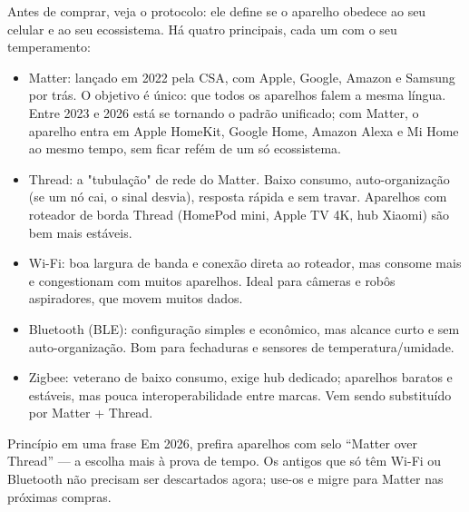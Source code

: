 


Antes de comprar, veja o protocolo: ele define se o aparelho obedece ao seu celular e ao seu ecossistema. Há quatro principais, cada um com o seu temperamento:

\begin{itemize}
  \item Matter: lançado em 2022 pela CSA, com Apple, Google, Amazon e Samsung por trás. O objetivo é único: que todos os aparelhos falem a mesma língua. Entre 2023 e 2026 está se tornando o padrão unificado; com Matter, o aparelho entra em Apple HomeKit, Google Home, Amazon Alexa e Mi Home ao mesmo tempo, sem ficar refém de um só ecossistema.
  \item Thread: a "tubulação" de rede do Matter. Baixo consumo, auto-organização (se um nó cai, o sinal desvia), resposta rápida e sem travar. Aparelhos com roteador de borda Thread (HomePod mini, Apple TV 4K, hub Xiaomi) são bem mais estáveis.
  \item Wi-Fi: boa largura de banda e conexão direta ao roteador, mas consome mais e congestionam com muitos aparelhos. Ideal para câmeras e robôs aspiradores, que movem muitos dados.
  \item Bluetooth (BLE): configuração simples e econômico, mas alcance curto e sem auto-organização. Bom para fechaduras e sensores de temperatura/umidade.
  \item Zigbee: veterano de baixo consumo, exige hub dedicado; aparelhos baratos e estáveis, mas pouca interoperabilidade entre marcas. Vem sendo substituído por Matter + Thread.
\end{itemize}

\begin{tcbinfo}{Princípio em uma frase}
Em 2026, prefira aparelhos com selo “Matter over Thread” — a escolha mais à prova de tempo. Os antigos que só têm Wi-Fi ou Bluetooth não precisam ser descartados agora; use-os e migre para Matter nas próximas compras.

\end{tcbinfo}

